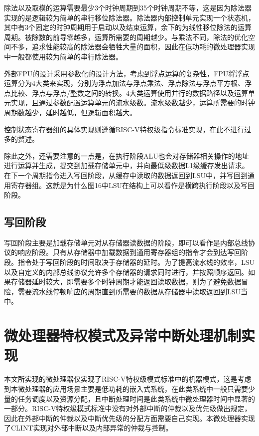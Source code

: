 除法以及取模的运算需要最少3个时钟周期到35个时钟周期不等，这是因为除法器实现的是逻辑较为简单的串行移位除法器。除法器内部控制单元实现一个状态机，其中有3个固定的时钟周期用于启动以及结束运算，余下的为线性移位除法的运算周期。被除数的前导零越多，运算所需要的周期越少。与乘法不同，除法的优化空间不多，追求性能较高的除法器会牺牲大量的面积，因此在低功耗的微处理器实现中一般都使用较为简单的串行除法器。

外部FPU的设计采用参数化的设计方法，考虑到浮点运算的复杂性，FPU将浮点运算分为4大类来实现，分别为浮点加法与浮点乘法、浮点除法与浮点平方根、浮点比较、浮点与浮点/整数之间的转换。4大类运算使用并行的数据路径以及运算单元实现，且通过参数配置运算单元的流水级数。流水级数越少，运算所需要的时钟周期数越少，延时越低，但逻辑面积越大。

控制状态寄存器组的具体实现则遵循RISC-V特权级指令标准实现，在此不进行过多的赘述。

除此之外，还需要注意的一点是，在执行阶段ALU也会对存储器相关操作的地址进行运算并生成，提交到加载存储单元中，并向最低级数据L1级缓存发出请求。在下一个周期指令进入写回阶段，从缓存中读取的数据返回到LSU中，并写回到通用寄存器组。这就是为什么图16中LSU在结构上可以看作是横跨执行阶段以及写回阶段。

\subsection{写回阶段}

写回阶段主要是加载存储单元对从存储器读数据的阶段，即可以看作是内部总线协议的响应阶段。只有从存储器中加载数据到通用寄存器组的指令才会到达写回阶段。指令处于写回阶段的时间取决于存储器的延时。为了提高流水线的效率，LSU以及自定义的内部总线协议允许多个存储器的请求同时进行，并按照顺序返回。如果存储器延时较大，即需要多个时钟周期才能返回读取数据，则为了避免数据冒险，需要流水线停顿响应的周期直到所需要的数据从存储器中读取返回到LSU当中。

\section{微处理器特权模式及异常中断处理机制实现}

本文所实现的微处理器仅实现了RISC-V特权级模式标准中的机器模式，这是考虑到本微处理器的应用场景主要是低功耗的嵌入式系统，在此类系统中一般只需要少量的任务调度以及资源分配，且中断处理时间是此类系统中微处理器时间中显著的一部分。RISC-V特权级模式标准中没有对外部中断的仲裁以及优先级做出规定，因此在外部中断的仲裁以及中断优先级的分配方面需要自己实现。本微处理器实现了CLINT实现对外部中断以及内部异常的仲裁与控制。

